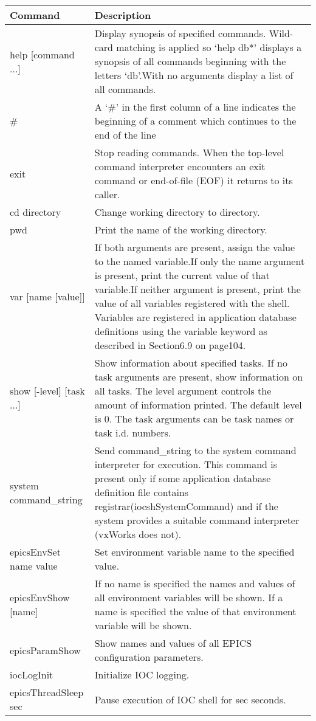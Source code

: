 \begin{center}
\begin{longtable}{p{1.59082in}p{5.21418in}}
Command & Description\\
\hline
help [command ...] & Display synopsis of specified commands.  Wild-card matching is applied so `help db*' displays a synopsis of all commands beginning with the letters `db'.With no arguments display a list of all commands.\\
\# & A `\#' in the first column of a line indicates the beginning of a comment which continues to the end of the line\\
exit & Stop reading commands. When the top-level command interpreter encounters an exit command or end-of-file (EOF) it returns to its caller.\\
cd directory & Change working directory to directory.\\
pwd & Print the name of the working directory.\\
var [name [value]] & If both arguments are present, assign the value to the named variable.If only the name argument is present, print the current value of that variable.If neither argument is present, print the value of all variables registered with the shell.  Variables are registered in application database definitions using the variable keyword as described in Section6.9 on page104.\\
show [-level] [task ...] & Show information about specified tasks.  If no task arguments are present, show information on all tasks.  The level argument controls the amount of information printed.  The default level is 0.  The task arguments can be task names or task i.d. numbers.\\
system command\_string & Send command\_string to the system command interpreter for execution.  This command is present only if some application database definition file contains registrar(iocshSystemCommand) and if the system provides a suitable command interpreter (vxWorks does not).\\
epicsEnvSet name value & Set environment variable name to the specified value.\\
epicsEnvShow  [name] & If no name is specified the names and values of all environment variables will be shown. If a name is specified the value of that environment variable will be shown.\\
epicsParamShow & Show names and values of all EPICS configuration parameters.\\
iocLogInit & Initialize IOC logging.\\
epicsThreadSleep sec & Pause execution of IOC shell for sec seconds.
\end{longtable}

\end{center}

